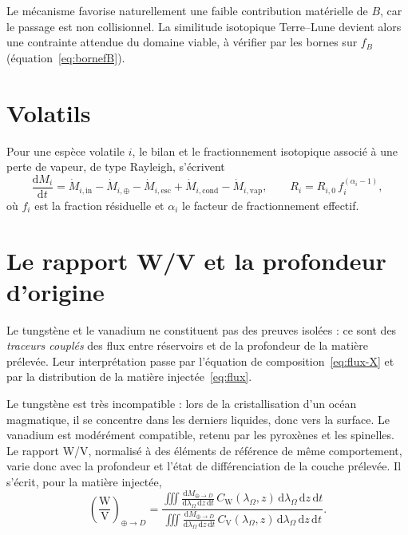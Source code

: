 \documentclass[11pt,a4paper,openany]{report}
\newcommand{\dd}{\mathrm{d}}
\begin{document}
\begin{apport}
Le mécanisme favorise naturellement une faible contribution matérielle de $B$, car le passage est
non collisionnel. La similitude isotopique Terre--Lune devient alors une contrainte attendue du
domaine viable, à vérifier par les bornes sur $f_B$ (équation~\eqref{eq:bornefB}).
\end{apport}

\section{Volatils}

Pour une espèce volatile $i$, le bilan et le fractionnement isotopique associé à une perte de
vapeur, de type Rayleigh, s'écrivent
\begin{equation}
\frac{\dd M_i}{\dd t}=\dot M_{i,\mathrm{in}}-\dot M_{i,\oplus}-\dot M_{i,\mathrm{esc}}
+\dot M_{i,\mathrm{cond}}-\dot M_{i,\mathrm{vap}},
\qquad
R_i=R_{i,0}\,f_i^{(\alpha_i-1)},
\label{eq:volatils}
\end{equation}
où $f_i$ est la fraction résiduelle et $\alpha_i$ le facteur de fractionnement effectif.


\section{Le rapport W/V et la profondeur d'origine}

Le tungstène et le vanadium ne constituent pas des preuves isolées : ce sont des \emph{traceurs
couplés} des flux entre réservoirs et de la profondeur de la matière prélevée. Leur interprétation
passe par l'équation de composition~\eqref{eq:flux-X} et par la distribution de la matière
injectée~\eqref{eq:flux}.


Le tungstène est très incompatible : lors de la cristallisation d'un océan magmatique, il se
concentre dans les derniers liquides, donc vers la surface. Le vanadium est modérément
compatible, retenu par les pyroxènes et les spinelles. Le rapport W/V, normalisé à des éléments de
référence de même comportement, varie donc avec la profondeur et l'état de différenciation de la
couche prélevée. Il s'écrit, pour la matière injectée,
\begin{equation}
\left(\frac{\mathrm{W}}{\mathrm{V}}\right)_{\oplus\to D}=
\frac{\displaystyle\iiint\frac{\dd M_{\oplus\to D}}{\dd\lambda_\Omega\,\dd z\,\dd t}\,
C_{\mathrm{W}}(\lambda_\Omega,z)\,\dd\lambda_\Omega\,\dd z\,\dd t}
{\displaystyle\iiint\frac{\dd M_{\oplus\to D}}{\dd\lambda_\Omega\,\dd z\,\dd t}\,
C_{\mathrm{V}}(\lambda_\Omega,z)\,\dd\lambda_\Omega\,\dd z\,\dd t}.
\label{eq:WV}
\end{equation}
\end{document}
